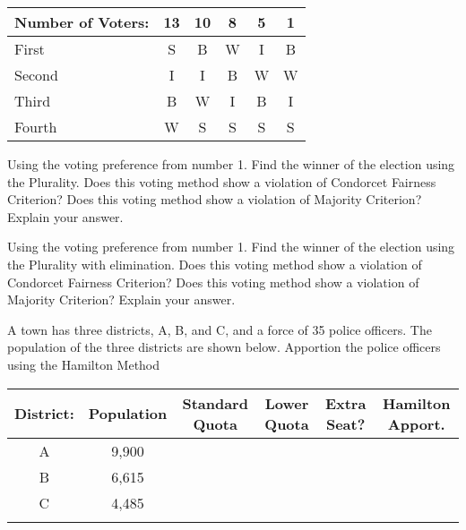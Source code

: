 \documentclass[11pt,epsfig]{article}
\begin{document}
\newpage

 \begin{center}
 \begin{tabular}{ | l | c | c  |  c |  c | c |}
   \hline
   Number of Voters: & 13 & 10 & 8 & 5 & 1\\ \hline
   First & S & B & W & I & B \\ \hline
   Second & I & I & B & W & W \\ \hline
   Third & B & W & I & B & I \\ \hline
   Fourth & W & S & S & S & S \\ \hline
   \end{tabular}
  \end{center}
  

\begin{problem}{13}
Using the voting preference from number 1. Find the winner of the election using the Plurality. Does this voting method show a violation of Condorcet Fairness Criterion? Does this voting method show a violation of Majority Criterion? Explain your answer.

\vfill
\end{problem}

  
\begin{problem}{13}
Using the voting preference from number 1. Find the winner of the election using the Plurality with elimination. Does this voting method show a violation of Condorcet Fairness Criterion? Does this voting method show a violation of Majority Criterion? Explain your answer.

\vfill
\end{problem}

\newpage

\begin{problem}{10}
A town has three districts, A, B, and C, and a force of 35 police officers. The population of the three districts are shown below. Apportion the police officers using the Hamilton Method
 \begin{center}
 \begin{tabular}{ | c | c | c | c | c | c |}
   \hline
   District: & Population & Standard Quota & Lower Quota & Extra Seat? & Hamilton Apport.\\ \hline
   A & 9,900 &  &  &  &  \\ \hline
   B & 6,615 &  &  &  &  \\ \hline
   C & 4,485 &  &  &  &  \\ \hline
    &  &  &  &  &  \\ \hline
   \end{tabular}
  \end{center}

\vfill
\end{problem}
\end{document}

